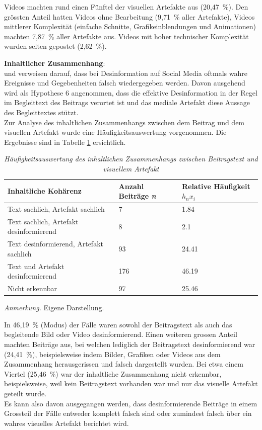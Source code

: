 \documentclass[12pt,a4paper]{article}        %
\begin{document}
Videos machten rund einen Fünftel der visuellen Artefakte aus (20,47 \%). Den grössten Anteil hatten Videos ohne Bearbeitung (9,71 \% aller Artefakte), Videos mittlerer Komplexität (einfache Schnitte, Grafikeinblendungen und Animationen) machten 7,87 \% aller Artefakte aus. Videos mit hoher technischer Komplexität wurden selten gepostet (2,62 \%).

\textbf{Inhaltlicher Zusammenhang}:\\
\Textcite[15]{bradshaw_industrialized_2021} und \textcite[3700]{weikmann_visual_2023} verweisen darauf, dass bei Desinformation auf Social Media oftmals wahre Ereignisse und Gegebenheiten falsch wiedergegeben werden.
Davon ausgehend wird als Hypothese 6 angenommen, dass die effektive Desinformation in der Regel im Begleittext des Beitrags verortet ist und das mediale Artefakt diese Aussage des Begleittextes stützt. \\

Zur Analyse des inhaltlichen Zusammenhangs zwischen dem Beitrag und dem visuellen Artefakt wurde eine Häufigkeitsauswertung vorgenommen. Die Ergebnisse sind in Tabelle \ref{tab:results_visual_coherence_table} ersichtlich.

\begin{table}[H]
  \caption{\textit{Häufigkeitsauswertung des inhaltlichen Zusammenhangs zwischen Beitragstext und visuellem Artefakt}}
  \label{tab:results_visual_coherence_table}
  \centering
  \begin{tabular}{|l|l|l|}\hline
    \textbf{Inhaltliche Kohärenz}&  \textbf{Anzahl Beiträge \textit{n}}& \textbf{Relative Häufigkeit \({h_n}{x_i}\)}\\\hline
    Text sachlich, Artefakt sachlich&  7& 1.84\\\hline
    Text sachlich, Artefakt desinformierend&  8& 2.1\\\hline
    Text desinformierend, Artefakt sachlich&  93& 24.41\\\hline
    Text und Artefakt desinformierend&  176& 46.19\\\hline
    Nicht erkennbar&  97& 25.46\\ \hline
  \end{tabular}
  \footnotesize\textit{Anmerkung.} Eigene Darstellung.
\end{table}
In 46,19 \% (Modus) der Fälle waren sowohl der Beitragstext als auch das begleitende Bild oder Video desinformierend. Einen weiteren grossen Anteil machten Beiträge aus, bei welchen lediglich der Beitragstext desinformierend war (24,41 \%), beispielsweise indem Bilder, Grafiken oder Videos aus dem Zusammenhang herausgerissen und falsch dargestellt wurden. Bei etwa einem Viertel (25,46 \%) war der inhaltliche Zusammenhang nicht erkennbar, beispielsweise, weil kein Beitragstext vorhanden war und nur das visuelle Artefakt geteilt wurde.\\
Es kann also davon ausgegangen werden, dass desinformierende Beiträge in einem Grossteil der Fälle entweder komplett falsch sind oder zumindest falsch über ein wahres visuelles Artefakt berichtet wird.
\end{document}
